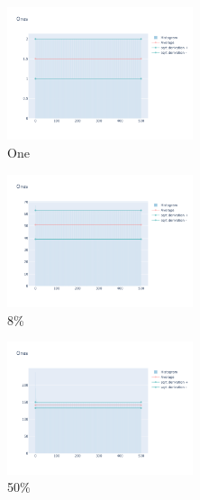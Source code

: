 \documentclass[12pt, fleqn]{report}                             %
\theoremstyle{break}                                            %
\begin{document}
      \begin{figure}[ht!]
        \centering
        \begin{subfigure}[b]{0.4\linewidth}
          \includegraphics[width=0.6\textwidth]{Images/134/dia-a.png}
          \caption{One}
        \end{subfigure}
        \begin{subfigure}[b]{0.4\linewidth}
          \includegraphics[width=0.6\textwidth]{Images/134/dia-b.png}
          \caption{8\%}
        \end{subfigure}
        \begin{subfigure}[b]{0.4\linewidth}
          \includegraphics[width=0.6\textwidth]{Images/134/dia-c.png}
          \caption{50\%}
        \end{subfigure}
        \begin{subfigure}[b]{0.4\linewidth}

\end{subfigure}
\end{figure}
\end{document}
